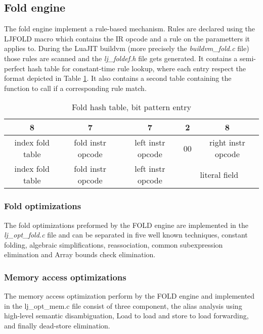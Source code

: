
\subsection{Fold engine}
\label{Subsec:fold}

The fold engine implement a rule-based mechanism. Rules are declared using the
LJFOLD macro which contains the IR opcode and a rule on the parametters it
applies to. During the LuaJIT buildvm (more precisely the \emph{buildvm\_fold.c}
file) those rules are scanned and the \emph{lj\_foldef.h} file gets generated.
It contains a semi-perfect hash table for constant-time rule lookup, where each
entry respect the format depicted in Table \ref{tab:fold-format}. It also
contains a second table containing the function to call if a corresponding rule
match.

\begin{table}[H]
\centering
\caption{Fold hash table, bit pattern entry}
\label{tab:fold-format}
\begin{tabular}{|c|c|c|c|c|}
\hline
8                & 7                 & 7                 & 2        & 8                       \\ \hline
index fold table & fold instr opcode & left instr opcode & 00       & right instr opcode      \\ \hline
index fold table & fold instr opcode & left instr opcode & \multicolumn{2}{c|}{literal field} \\ \hline
\end{tabular}
\end{table}

\subsubsection{Fold optimizations}
\label{Subsubsec:fold}

The fold optimizations preformed by the FOLD engine are implemented in the
\emph{lj\_opt\_fold.c} file and can be separated in five well known techniques,
constant folding, algebraic simplifications, reassociation, common subexpression
elimination and Array bounds check elimination.

\subsubsection{Memory access optimizations}
\label{Subsubsec:mao}

The memory access optimization perform by the FOLD engine and implemented
in the lj\_opt\_mem.c file consist of three component, the alias
analysis using high-level semantic disambiguation, Load to load and store to load
forwarding, and finally dead-store elimination.
